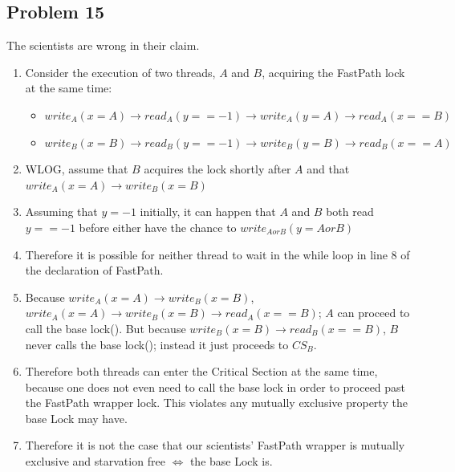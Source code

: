 \documentclass[]{article}
\begin{document}
\subsection{Problem 15}
The scientists are wrong in their claim.
\begin{enumerate}
	\item Consider the execution of two threads, $A$ and $B$, acquiring the FastPath lock at the same time:
	\begin{itemize}
		\item $write_A(x = A) \rightarrow read_A(y == -1) \rightarrow write_A(y = A) \rightarrow read_A(x == B)$
		\item $write_B(x = B) \rightarrow read_B(y == -1) \rightarrow write_B(y = B) \rightarrow read_B(x == A)$
	\end{itemize}
	\item WLOG, assume that $B$ acquires the lock shortly after $A$ and that $write_A(x = A) \rightarrow write_B(x = B)$
	\item Assuming that $y = -1$ initially, it can happen that $A$ and $B$ both read $y == -1$ before either have the chance to $write_{A or B}(y = A or B)$
	\item Therefore it is possible for neither thread to wait in the while loop in line 8 of the declaration of FastPath.
	\item Because $write_A(x = A) \rightarrow write_B(x = B)$, $write_A(x = A) \rightarrow write_B(x = B) \rightarrow read_A(x == B)$; $A$ can proceed to call the base lock(). But because $write_B(x = B) \rightarrow read_B(x == B)$, $B$ never calls the base lock(); instead it just proceeds to $CS_B$.
	\item Therefore both threads can enter the Critical Section at the same time, because one does not even need to call the base lock in order to proceed past the FastPath wrapper lock. This violates any mutually exclusive property the base Lock may have.
	\item Therefore it is not the case that our scientists' FastPath wrapper is mutually exclusive and starvation free $\Leftrightarrow$ the base Lock is.
\end{enumerate}
\end{document}

